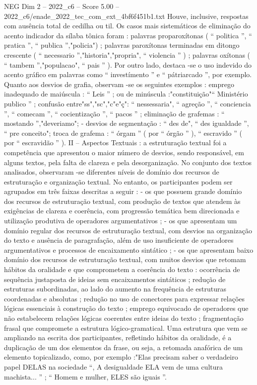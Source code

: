 \begin{textsample}{NEG Dim 2 – 2022\_c6 – Score 5.00 – 2022\_c6/enade\_2022\_tec\_com\_ext\_4bf6f451b1.txt}
Houve, inclusive, respostas com ausência total de cedilha ou til.
Os casos mais sistemáticos de eliminação do acento indicador da sílaba tônica foram : palavras proparoxítonas ( “ politica ”, “ pratica ”, “ publica ”,"policia") ; palavras paroxítonas terminadas em ditongo crescente ( “ necessario ”,"historia","propria", “ violencia ” ) ; palavras oxítonas ( “ tambem ”,"populacao", “ pais ” ).
Por outro lado, destaca -se o uso indevido do acento gráfico em palavras como “ investímento ” e “ pátriarcado ”, por exemplo.
Quanto aos desvios de grafia, observam -se os seguintes exemplos : emprego inadequado de maiúscula : “ Leis ” ; ou de minúscula :"constituição"“ Ministério publico ” ; confusão entre"ss","sc","c"e"ç": “ nessessaria", “ agreção ”, “ conciencia ”, “ comecam ”, “ cocientização ”, “ pacos ” ; eliminação de grafemas : “ mostando ”,"deveriamo"; - desvios de segmentação : “ des de", “ des igualdade ”, “ pre conceito"; troca de grafema : “ órgam ” ( por “ órgão ” ), “ escravido ” ( por “ escravidão ” ).
II – Aspectos Textuais : a estruturação textual foi a competência que apresentou o maior número de desvios, sendo responsável, em alguns textos, pela falta de clareza e pela desorganização.
No conjunto dos textos analisados, observaram -se diferentes níveis de domínio dos recursos de estruturação e organização textual.
No entanto, os participantes podem ser agrupados em três faixas descritas a seguir : - os que possuem grande domínio dos recursos de estruturação textual, com produção de textos que atendem às exigências de clareza e coerência, com progressão temática bem direcionada e utilização produtiva de operadores argumentativos ; - os que apresentam um domínio regular dos recursos de estruturação textual, com desvios na organização do texto e ausência de paragrafação, além de uso insuficiente de operadores argumentativos e processos de encaixamento sintático ; - os que apresentam baixo domínio dos recursos de estruturação textual, com muitos desvios que retomam hábitos da oralidade e que comprometem a coerência do texto : ocorrência de sequência justaposta de ideias sem encaixamentos sintáticos ; redução de estruturas subordinadas, ao lado do aumento na frequência de estruturas coordenadas e absolutas ; redução no uso de conectores para expressar relações lógicas essenciais à construção do texto ; emprego equivocado de operadores que não estabelecem relações lógicas coerentes entre ideias do texto ; fragmentação frasal que compromete a estrutura lógico-gramatical.
Uma estrutura que vem se ampliando na escrita dos participantes, refletindo hábitos da oralidade, é a duplicação de um dos elementos da frase, ou seja, a retomada anafórica de um elemento topicalizado, como, por exemplo :"Elas precisam saber o verdadeiro papel DELAS na sociedade “, A desigualdade ELA vem de uma cultura machista... ” ; “ Homem e mulher, ELES são iguais ”.

\end{textsample}
